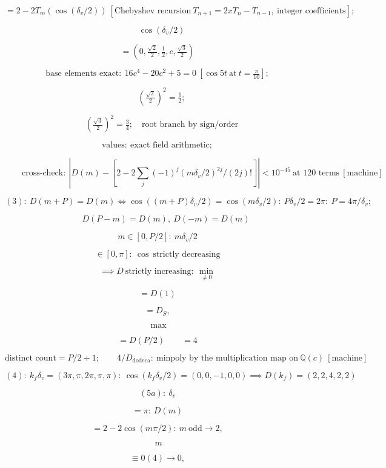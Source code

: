 \begin{theorem}
\[
= 2-2T_m(\cos(\delta_v/2))\ [\text{Chebyshev recursion}\ T_{n+1}=2xT_n-T_{n-1},\ \text{integer coefficients}];
\]

\[
\quad\cos(\delta_v/2)
\]

\[
= (0,\tfrac{\sqrt2}2,\tfrac12,c,\tfrac{\sqrt3}2)
\]

\[
\text{base elements exact}:\ 16c^4-20c^2+5=0\ [\cos5t\ \text{at}\ t=\tfrac\pi{10}];
\]

\[
\quad (\tfrac{\sqrt2}2)^2=\tfrac12;
\]

\[
\quad (\tfrac{\sqrt3}2)^2=\tfrac34;\quad\text{root branch by sign/order}
\]

\[
\text{values}:\ \text{exact field arithmetic};
\]

\[
\qquad \text{cross-check}:\ |D(m)-[2-2\sum_j(-1)^j(m\delta_v/2)^{2j}/(2j)!]|<10^{-45}\ \text{at 120 terms}\ [\text{machine}]
\]

\[
(3):\ D(m+P)=D(m)\iff\cos((m+P)\delta_v/2)=\cos(m\delta_v/2):\ P\delta_v/2=2\pi:\ P=4\pi/\delta_v;
\]

\[
\qquad D(P-m)=D(m),\ D(-m)=D(m)
\]

\[
m \in [0,P/2]:\ m\delta_v/2
\]

\[
\in [0,\pi]:\ \cos\ \text{strictly decreasing}
\]

\[
\implies D\ \text{strictly increasing}:\ \min_{\ne0}
\]

\[
= D(1)
\]

\[
= D_S,
\]

\[
\ \max
\]

\[
= D(P/2)\qquad = 4
\]

\[
\text{distinct count}=P/2+1;\qquad 4/D_{\mathrm{dodeca}}:\ \text{minpoly by the multiplication map on}\ \mathbb Q(c)\ [\text{machine}]
\]

\[
(4):\ k_f\delta_v=(3\pi,\pi,2\pi,\pi,\pi):\ \cos(k_f\delta_v/2)=(0,0,-1,0,0)\implies D(k_f)=(2,2,4,2,2)
\]

\[
(5a):\ \delta_v
\]

\[
= \pi:\ D(m)
\]

\[
= 2-2\cos(m\pi/2):\ m\ \text{odd}\to2,
\]

\[
\ m
\]

\[
\equiv 0(4)\to0,
\]


\end{theorem}

